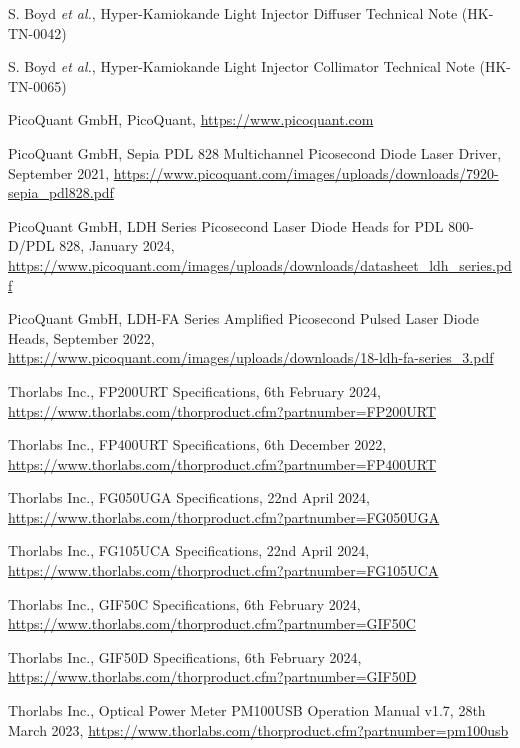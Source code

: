 \documentclass[a4paper,11pt]{article}
\begin{document}
\newpage
\begin{thebibliography}{99}

S. Boyd {\it et al.}, Hyper-Kamiokande Light Injector Diffuser Technical Note (HK-TN-0042)

S. Boyd {\it et al.}, Hyper-Kamiokande Light Injector Collimator Technical Note (HK-TN-0065)

PicoQuant GmbH, PicoQuant, \url{https://www.picoquant.com}

PicoQuant GmbH, Sepia PDL 828 Multichannel Picosecond Diode Laser Driver, September 2021, \url{https://www.picoquant.com/images/uploads/downloads/7920-sepia_pdl828.pdf}

PicoQuant GmbH, LDH Series Picosecond Laser Diode Heads for PDL 800-D/PDL 828, January 2024, \url{https://www.picoquant.com/images/uploads/downloads/datasheet_ldh_series.pdf}

PicoQuant GmbH, LDH-FA Series Amplified Picosecond Pulsed Laser Diode Heads, September 2022, \url{https://www.picoquant.com/images/uploads/downloads/18-ldh-fa-series_3.pdf}

Thorlabs Inc., FP200URT Specifications, 6th February 2024, \url{https://www.thorlabs.com/thorproduct.cfm?partnumber=FP200URT}

Thorlabs Inc., FP400URT Specifications, 6th December 2022, \url{https://www.thorlabs.com/thorproduct.cfm?partnumber=FP400URT}

Thorlabs Inc., FG050UGA Specifications, 22nd April 2024, \url{https://www.thorlabs.com/thorproduct.cfm?partnumber=FG050UGA}

Thorlabs Inc., FG105UCA Specifications, 22nd April 2024, \url{https://www.thorlabs.com/thorproduct.cfm?partnumber=FG105UCA}

Thorlabs Inc., GIF50C Specifications, 6th February 2024, \url{https://www.thorlabs.com/thorproduct.cfm?partnumber=GIF50C}

Thorlabs Inc., GIF50D Specifications, 6th February 2024, \url{https://www.thorlabs.com/thorproduct.cfm?partnumber=GIF50D}


Thorlabs Inc., Optical Power Meter PM100USB Operation Manual v1.7, 28th March 2023, \url{https://www.thorlabs.com/thorproduct.cfm?partnumber=pm100usb}


\end{thebibliography}
\end{document}
